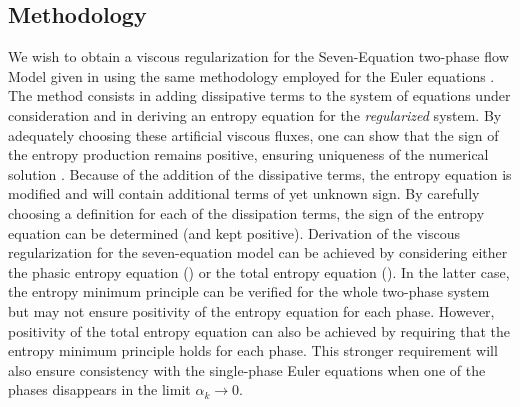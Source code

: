 \documentclass[preprint,10pt]{elsarticle}
\begin{document}
\subsection{Methodology}
%
We wish to obtain a viscous regularization for the Seven-Equation two-phase flow Model given in  using the same methodology employed for the Euler equations \cite{jlg, Marco_paper_low_mach}. The method consists in adding dissipative terms to the system of equations under consideration and in deriving an entropy equation for the {\it regularized} system. By adequately choosing these artificial viscous fluxes, one can show that the sign of the entropy production remains positive, ensuring uniqueness of the numerical solution \cite{Leveque}. Because of the addition of the dissipative terms, the entropy equation is modified and will contain additional terms of yet unknown sign. By carefully choosing a definition for each of the dissipation terms, the sign of the entropy equation can be determined (and kept positive). Derivation of the viscous regularization for the seven-equation model can be achieved by considering either the phasic entropy equation () or the total entropy equation (). In the latter case, the entropy minimum principle can be verified for the whole two-phase system but may not ensure positivity of the entropy equation for each phase. However, positivity of the total entropy equation can also be achieved by requiring that the entropy minimum principle holds for each phase. This stronger requirement will also ensure consistency with the single-phase Euler equations when one of the phases disappears in the limit $\alpha_k \to 0$. 
\end{document}
